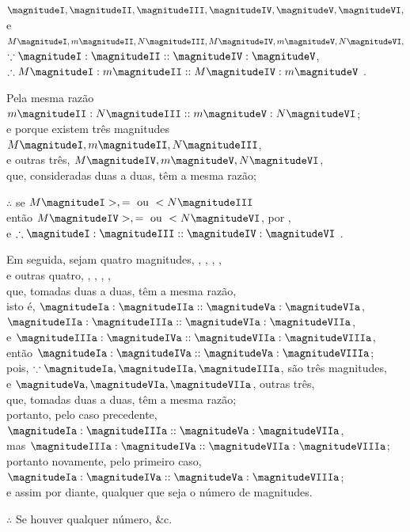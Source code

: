 \documentclass[booklanguage=brazilian]{byrnebook}
\begin{document}
\begin{center}
$\magnitudeI, \magnitudeII, \magnitudeIII, \magnitudeIV, \magnitudeV, \magnitudeVI,$\\
e\\
$M \magnitudeI, m \magnitudeII, N \magnitudeIII, M \magnitudeIV, m \magnitudeV, N \magnitudeVI,$\\
$\because \magnitudeI : \magnitudeII :: \magnitudeIV : \magnitudeV$,\\ %
$\therefore M \magnitudeI : m \magnitudeII :: M \magnitudeIV : m \magnitudeV$ .

Pela mesma razão\\
$m \magnitudeII : N \magnitudeIII :: m \magnitudeV : N \magnitudeVI$;\\
e porque existem três magnitudes\\
$M \magnitudeI, m \magnitudeII, N \magnitudeIII$,\\
e outras três, $M \magnitudeIV, m \magnitudeV, N \magnitudeVI$,\\
que, consideradas duas a duas, têm a mesma razão;

$\therefore$ se $M \magnitudeI >, = \mbox{ ou } < N \magnitudeIII$\\
então $M \magnitudeIV >, = \mbox{ ou } < N \magnitudeVI$, por ,\\
e $\therefore \magnitudeI : \magnitudeIII :: \magnitudeIV : \magnitudeVI$ .

Em seguida, sejam quatro magnitudes, , , , ,\\
e outras quatro, , , , ,\\
que, tomadas duas a duas, têm a mesma razão,\\
isto é, $\magnitudeIa : \magnitudeIIa :: \magnitudeVa : \magnitudeVIa$,\\
$\magnitudeIIa : \magnitudeIIIa :: \magnitudeVIa : \magnitudeVIIa$,\\
e $\magnitudeIIIa : \magnitudeIVa :: \magnitudeVIIa : \magnitudeVIIIa$,\\
então $\magnitudeIa : \magnitudeIVa :: \magnitudeVa : \magnitudeVIIIa$;\\
pois, $\because \magnitudeIa, \magnitudeIIa, \magnitudeIIIa$, são três magnitudes,\\ %
e $\magnitudeVa, \magnitudeVIa, \magnitudeVIIa$, outras três,\\
que, tomadas duas a duas, têm a mesma razão;\\
portanto, pelo caso precedente, $\magnitudeIa : \magnitudeIIIa :: \magnitudeVa : \magnitudeVIIa$,\\
mas $\magnitudeIIIa : \magnitudeIVa :: \magnitudeVIIa : \magnitudeVIIIa$;\\
portanto novamente, pelo primeiro caso, $\magnitudeIa : \magnitudeIVa :: \magnitudeVa : \magnitudeVIIIa$;\\
e assim por diante, qualquer que seja o número de magnitudes.

$\therefore$ Se houver qualquer número, \&c.
\end{center}
\end{document}
